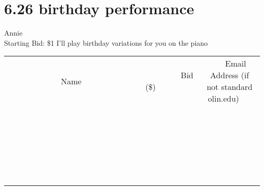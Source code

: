 \documentclass[11pt]{article}
\begin{document}
\section*{6.26 birthday performance}
Annie 
\\
Starting Bid: \$1
\newline
I'll play birthday variations for you on the piano
\\[6ex]
\begin{tabular}{c c c}
~~~~~~~~~~~~~Name~~~~~~~~~~~~~ & ~~~~~~~~~Bid (\$)~~~~~~~~~  & ~~~Email Address (if not standard olin.edu)~~~\\
 & & \\
\hline
 & & \\
\hline
 & & \\
\hline
 & & \\
\hline
 & & \\
\hline
 & & \\
\hline
 & & \\
\hline
 & & \\
\hline
 & & \\
\hline
 & & \\
\hline
 & & \\
\hline
 & & \\
\hline
 & & \\
\hline
 & & \\
\hline
 & & \\
\hline
 & & \\
\hline
 & & \\
\hline
 & & \\
\hline
 & & \\
\hline
 & & \\
\hline
 & & \\
\hline
 & & \\
\hline
 & & \\
\hline
 & & \\
\hline
 & & \\
\hline
 & & \\
\hline
\end{tabular}
\newpage
\end{document}

